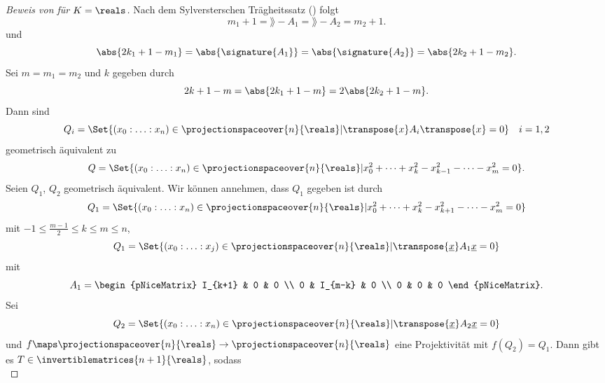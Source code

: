 \begin{proof}[Beweis von  für \( K=\reals \)]
  Nach dem Sylversterschen Trägheitssatz () folgt
  \begin{equation*}
    m_1+1=\rang-{A_1}=\rang-{A_2}=m_2+1.
  \end{equation*}
  und
  \begin{equation*}
    \abs{2k_1+1-m_1}=\abs{\signature{A_1}}=\abs{\signature{A_2}}=\abs{2k_2+1-m_2}.
  \end{equation*}
  Sei \( m=m_1=m_2 \) und \( k \) gegeben durch
  \begin{equation*}
    2k+1-m=\abs{2k_1+1-m}=2\abs{2k_2+1-m}.
  \end{equation*}
  Dann sind
  \begin{equation*}
    Q_i=\Set{(x_0:\dotsc:x_n)\in \projectionspaceover{n}{\reals}|\transpose{x}A_i\transpose{x}=0}\quad i=1,2
  \end{equation*}
  geometrisch äquivalent zu
  \begin{equation*}
    Q=\Set{(x_0:\dotsc:x_n)\in \projectionspaceover{n}{\reals}|x_0^2+\dotsb+x_k^2-x_{k-1}^2-\dotsb-x_m^2=0}.
  \end{equation*}
  Seien \( Q_1 \), \( Q_2 \) geometrisch äquivalent. Wir können annehmen, dass \( Q_1 \) gegeben ist durch
  \begin{equation*}
    Q_1=\Set{(x_0:\dotsc:x_n)\in \projectionspaceover{n}{\reals}|x_0^2+\dotsb+x_k^2-x_{k+1}^2-\dotsb-x_m^2=0}
  \end{equation*}
  mit \( -1\leq \frac{m-1}{2}\leq k\leq m\leq n \), \dh 
  \begin{equation*}
    Q_1=\Set{(x_0:\dotsc:x_j)\in \projectionspaceover{n}{\reals}|\transpose{\underline{x}}A_1\underline{x}=0}
  \end{equation*}
  mit
  \begin{equation*}
    A_1=\begin{pNiceMatrix} I_{k+1} & 0 & 0 \\ 0 & I_{m-k} & 0 \\ 0 & 0 & 0 \end{pNiceMatrix}.
  \end{equation*}
  Sei 
  \begin{equation*}
    Q_2=\Set{(x_0:\dotsc:x_n)\in\projectionspaceover{n}{\reals}|\transpose{\underline{x}}A_2\underline{x}=0}
  \end{equation*}
  und \( f\maps \projectionspaceover{n}{\reals}\to\projectionspaceover{n}{\reals} \) eine Projektivität mit \( f(Q_2)=Q_1 \). Dann gibt es \( T\in \invertiblematrices{n+1}{\reals} \), sodass
  \begin{equation*}

\end{equation*}
\end{proof}

